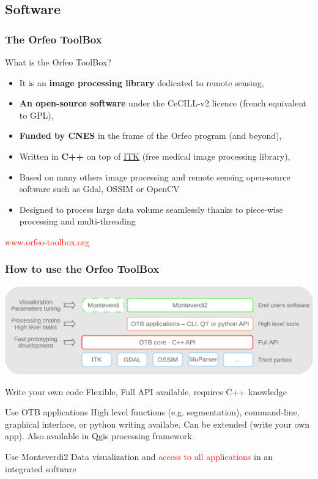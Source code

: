 \documentclass[8pt]{beamer}
\begin{document}
\subsection{Software}
\begin{frame}
\frametitle{The Orfeo ToolBox}
\begin{block}{What is the Orfeo ToolBox?}
\begin{itemize}
\item It is an \textbf{image processing library} dedicated to remote sensing,
\item \textbf{An open-source software} under the CeCILL-v2 licence (french equivalent to GPL),
\item \textbf{Funded by CNES} in the frame of the Orfeo program (and beyond),
\item Written in \textbf{C++} on top of \href{www.itk.org}{ITK} (free medical image processing library),
\item Based on many others image processing and remote sensing open-source software such as Gdal, OSSIM or OpenCV
\item Designed to process large data volume seamlessly thanks to piece-wise processing and multi-threading
\end{itemize}
\end{block}
\begin{center}
{\huge\textcolor{red}{www.orfeo-toolbox.org}}
\end{center}
\end{frame}


\begin{frame}
\frametitle{How to use the Orfeo ToolBox}
\vspace{-0.5cm}
\begin{center}
\includegraphics[width=\textwidth]{../OTB-General/images/sandwich.pdf}
\end{center}
\vspace{-0.5cm}
\begin{block}{Write your own code}
 Flexible, Full API available, requires C++ knowledge
\end{block}
\begin{block}{Use OTB applications}
  High level functions (e.g. segmentation), command-line, graphical interface, or python writing availabe. Can be extended (write your own app). Also available in Qgis processing framework.
\end{block}
\begin{block}{Use Monteverdi2}
Data visualization and  \textcolor{red}{access to all applications} in an integrated software
\end{block}
\end{frame}
\end{document}

